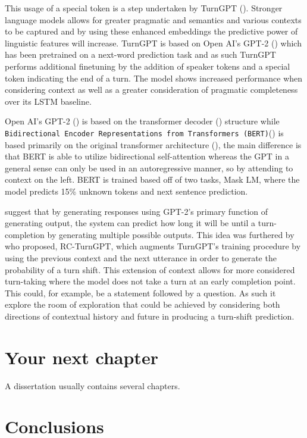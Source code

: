 \documentclass[logo,bsc,singlespacing,parskip]{infthesis}
\begin{document}
This usage of a special token is a step undertaken by TurnGPT (\cite{Ekstedt2020}). Stronger language models allows for greater pragmatic and semantics and various contexts to be captured and by using these enhanced embeddings the predictive power of linguistic features will increase. TurnGPT is based on Open AI's GPT-2 (\cite{Radford2019}) which has been pretrained on a next-word prediction task and as such TurnGPT performs additional finetuning by the addition of speaker tokens and a special token indicating the end of a turn. The model shows increased performance when considering context as well as a greater consideration of pragmatic completeness over its LSTM baseline.  

Open AI's GPT-2 (\cite{Radford2019}) is based on the transformer decoder (\cite{Liu2018}) structure while \texttt{Bidirectional Encoder Representations from Transformers (BERT)}(\cite{}) is based primarily on the original transformer architecture (\cite{Vaswani2017}), the main difference is that BERT is able to utilize bidirectional self-attention whereas the GPT in a general sense can only be used in an autoregressive manner, so by attending to context on the left. BERT is trained based off of two tasks, Mask LM, where the model predicts 15\% unknown tokens and next sentence prediction.

\cite{Ekstedt2020} suggest that by generating responses using GPT-2's primary function of generating output, the system can predict how long it will be until a turn-completion by generating multiple possible outputs. This idea was furthered by \cite{Jiang2023} who proposed, RC-TurnGPT, which augments TurnGPT's training procedure by using the previous context and the next utterance in order to generate the probability of a turn shift. This extension of context allows for more considered turn-taking where the model does not take a turn at an early completion point. This could, for example, be a statement followed by a question. As such it explore the room of exploration that could be achieved by considering both directions of contextual history and future in producing a turn-shift prediction.  

\chapter{Your next chapter}

A dissertation usually contains several chapters.

\chapter{Conclusions}
\end{document}
